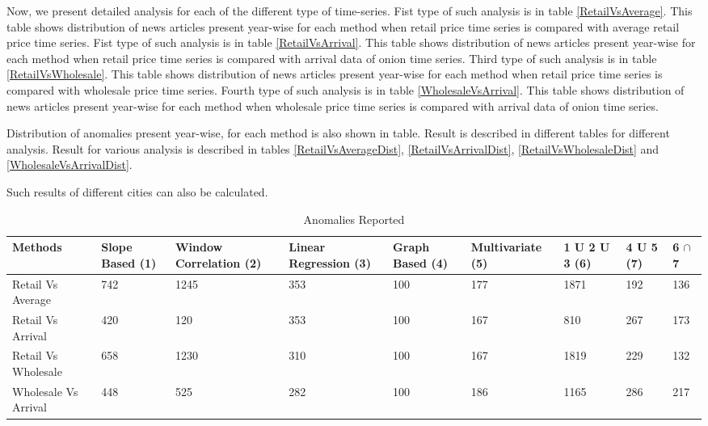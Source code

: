 \documentclass[a4paper,10pt]{report}
\begin{document}
Now, we present detailed analysis for each of the different type of time-series. Fist type of such analysis is in table \ref{RetailVsAverage}. This table shows distribution of news articles present year-wise for each method when retail price time series is compared with average retail price time series. Fist type of such analysis is in table \ref{RetailVsArrival}. This table shows distribution of news articles present year-wise for each method when retail price time series is compared with arrival data of onion time series. Third type of such analysis is in table \ref{RetailVsWholesale}. This table shows distribution of news articles present year-wise for each method when retail price time series is compared with wholesale price time series. Fourth type of such analysis is in table \ref{WholesaleVsArrival}. This table shows distribution of news articles present year-wise for each method when wholesale price time series is compared with arrival data of onion time series.

Distribution of anomalies present year-wise, for each method is also shown in table. Result is described in different tables for different analysis. Result for various analysis is described in tables  \ref{RetailVsAverageDist}, \ref{RetailVsArrivalDist}, \ref{RetailVsWholesaleDist} and \ref{WholesaleVsArrivalDist}.

Such results of different cities can also be calculated.




	\begin{table}[]
	\centering
	
	\resizebox{\textwidth}{!}
	{\begin{tabular}{|l|l|l|l|l|l|l|l|l|}
	\hline
	Methods		    & Slope Based (1) & Window Correlation (2) & Linear Regression (3) & Graph Based (4) & Multivariate (5) & 1 U 2 U 3 (6) & 4 U 5 (7) & 6  $\cap$ 7 \\
	\hline
	Retail Vs Average    & 742             & 1245                   & 353                   & 100             & 177              & 1871          & 192       & 136       \\
	\hline
	Retail Vs Arrival    & 420             & 120                    & 353                   & 100             & 167              & 810           & 267       & 173       \\
	\hline
	Retail Vs Wholesale  & 658             & 1230                   & 310                   & 100             & 167              & 1819          & 229       & 132       \\
	\hline
	Wholesale Vs Arrival & 448             & 525                    & 282                   & 100             & 186              & 1165          & 286       & 217       \\
	\hline
	\end{tabular}}
	\caption{Anomalies Reported}
	\label{AnomaliesReported}
	\end{table}
    
\end{document}
